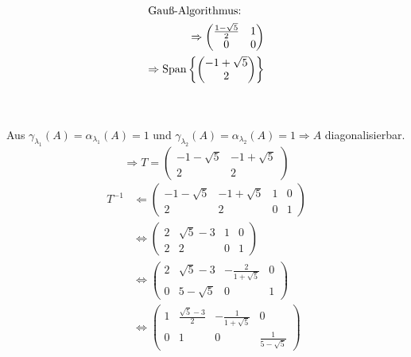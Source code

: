 \documentclass{HM}
\newcommand{\Span}{\text{Span}}
\begin{document}
\begin{enumerate}
\begin{enumerate}
\begin{minipage}{.5\textwidth}
\begin{align*}
			\intertext{Gauß-Algorithmus:}
			\Rightarrow\begin{pmatrix}
				\frac{1-\sqrt{5}}{2}&1\\
				0&0
			\end{pmatrix}\\
			\Rightarrow\Span\left\lbrace\begin{pmatrix}
				-1+\sqrt{5}\\
				2
			\end{pmatrix}\right\rbrace
			\end{align*}
		\end{minipage}\\\\
		Aus $\gamma_{\lambda_1}(A)=\alpha_{\lambda_1}(A)=1$ und $\gamma_{\lambda_2}(A)=\alpha_{\lambda_2}(A)=1 \Rightarrow A$ diagonalisierbar.\\
		$$\Rightarrow T=\begin{pmatrix}
			-1-\sqrt{5}& -1+\sqrt{5}\\
			2&2
		\end{pmatrix}$$
		\begin{align*}
			T^{-1}&\Leftarrow \begin{pmatrix}
				-1-\sqrt{5}& -1+\sqrt{5}&1&0\\
				2&2&0&1
			\end{pmatrix}\\
			&\Leftrightarrow\begin{pmatrix}
				2&\sqrt{5}-3&1&0\\
				2&2&0&1
			\end{pmatrix}\\
			&\Leftrightarrow\begin{pmatrix}
				2&\sqrt{5}-3&-\frac{2}{1+\sqrt{5}}&0\\
				0&5-\sqrt{5}&0&1
			\end{pmatrix}\\
			&\Leftrightarrow\begin{pmatrix}
				1&\frac{\sqrt{5}-3}{2}&-\frac{1}{1+\sqrt{5}}&0\\
				0&1&0&\frac{1}{5-\sqrt{5}}
			\end{pmatrix}\\
		\end{align*}
		

\end{enumerate}
\end{enumerate}
\end{document}
